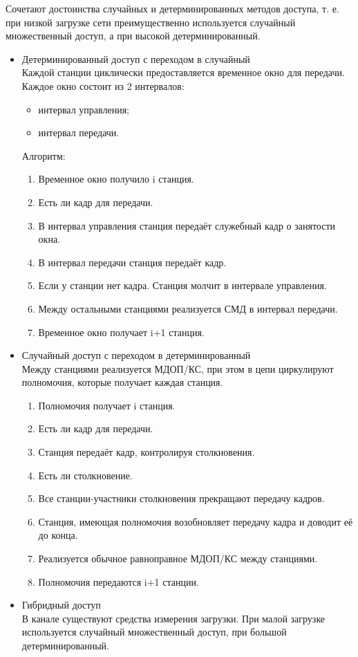 \documentclass[12pt, russian, oneside, article]{ncc}
\begin{document}
Сочетают достоинства случайных и детерминированных методов доступа, т. е. при низкой загрузке сети преимущественно используется случайный множественный доступ, а при высокой детерминированный.
\begin{itemize}

\item Детерминированный доступ с переходом в случайный\\
\label{sec-5_1_3_1}%
Каждой станции циклически предоставляется временное окно для передачи. Каждое окно состоит из 2 интервалов:
\begin{itemize}
\item интервал управления;
\item интервал передачи.
\end{itemize}

Алгоритм:
\begin{enumerate}
\item Временное окно получило i станция.
\item Есть ли кадр для передачи.
\item В интервал управления станция передаёт служебный кадр о занятости окна.
\item В интервал передачи станция передаёт кадр.
\item Если у станции нет кадра. Станция молчит в интервале управления.
\item Между остальными станциями реализуется СМД в интервал передачи.
\item Временное окно получает i+1 станция.
\end{enumerate}


\item Случайный доступ с переходом в детерминированный\\
\label{sec-5_1_3_2}%
Между станциями реализуется МДОП/КС, при этом в цепи циркулируют полномочия, которые получает каждая станция.

\begin{enumerate}
\item Полномочия получает i станция.
\item Есть ли кадр для передачи.
\item Станция передаёт кадр, контролируя столкновения.
\item Есть ли столкновение.
\item Все станции-участники столкновения прекращают передачу кадров.
\item Станция, имеющая полномочия возобновляет передачу кадра и доводит её до конца.
\item Реализуется обычное равноправное МДОП/КС между станциями.
\item Полномочия передаются i+1 станции.
\end{enumerate}


\item Гибридный доступ\\
\label{sec-5_1_3_3}%
В канале существуют средства измерения загрузки. При малой загрузке используется случайный множественный доступ, при большой детерминированный.

\end{itemize} %
\end{document}
